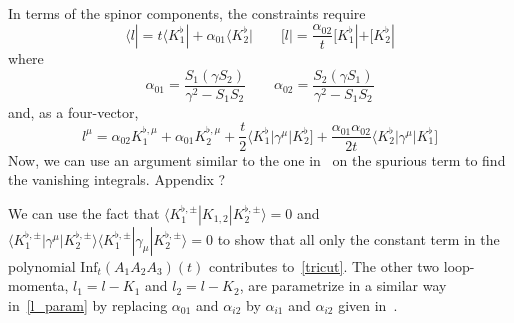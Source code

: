In terms of the spinor components, the constraints require
\begin{equation}\label{l_param}
\langle l | = t\langle K_1^\flat| + \alpha_{01}\langle K_2^\flat| \quad\quad
[ l | = \frac{\alpha_{02}}{t}[ K_1^\flat| + [ K_2^\flat|
\end{equation}
where
\begin{equation}
\alpha_{01} = \frac{S_1(\gamma S_2)}{\gamma^2 - S_1S_2}\quad \quad
\alpha_{02} = \frac{S_2(\gamma S_1)}{\gamma^2 - S_1S_2}
\end{equation}
%
and, as a four-vector,
\begin{equation}
l^\mu = \alpha_{02} K_1^{\flat,\mu} + \alpha_{01}K_2^{\flat,\mu} + \frac{t}{2}\langle K_1^\flat | \gamma^\mu |K_2^\flat] + \frac{\alpha_{01}\alpha_{02}}{2t}\langle K_2^\flat|\gamma^\mu |K_1^\flat]
\end{equation}
%
Now, we can use an argument similar to the one in~\cite{Ossola:2006us} on the spurious term to find the vanishing integrals.
\color{red}Appendix ?\color{black}
%
\iffalse
To illustrate this argument, we consider the case of a rank-1 3-point-like integral. 
By simple arguments on the rank and the dependence on external momenta, 
\begin{equation}
\int\dd^D q \frac{q^\mu}{D_0(q)D_1(q+p_1)D_2(q+p_2)} = c_1p_1^\mu + c_2p_2^\mu
\end{equation}
If we contract the above relation with a vector $v^\mu$ orthogonal to $p_1$ and $p_2$, we obtain a vanishing integral.
$q\cdot v$ is hence a spurious term.
The same technique can be applied to show that $(q\cdot v)^n$ is spurious for any $n>0$. 
\fi
%
We can use the fact that $\langle K_1^{\flat,\pm} | K_{1,2}|K_2^{\flat,\pm}\rangle = 0 $ and $\langle K_1^{\flat,\pm}|\gamma^\mu|K_{2}^{\flat,\pm}\rangle\langle K_1^{\flat,\pm}|\gamma_\mu|K_{2}^{\flat,\pm}\rangle = 0$
to show that all only the constant term in the polynomial $\mathrm{Inf}_t(A_1A_2A_3)(t)$ contributes to~\cref{tricut}. 
The other two loop-momenta, $l_1 = l-K_1$ and $l_2 = l-K_2$, are parametrize in a similar way in~\cref{l_param} by replacing $\alpha_{01}$ and $\alpha_{i2}$ by $\alpha_{i1}$ and $\alpha_{i2}$ given in~\cite{Forde:2007mi}.
%
%
